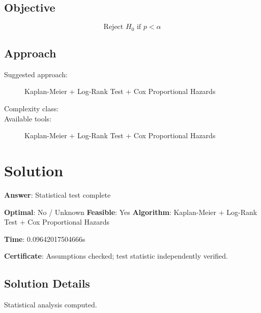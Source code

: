\documentclass[11pt, a4paper]{article}
\begin{document}
\subsection{Objective}

\begin{equation}
\text{Reject } H_0 \text{ if } p < \alpha
\end{equation}

\subsection{Approach}

\begin{description}
  \item[Suggested approach:] Kaplan-Meier + Log-Rank Test + Cox Proportional Hazards
  \item[Complexity class:] 
  \item[Available tools:] Kaplan-Meier + Log-Rank Test + Cox Proportional Hazards
\end{description}
\section{Solution}

\begin{polyaresult}

\textbf{Answer}: Statistical test complete


\textbf{Optimal}: No / Unknown \hfill
\textbf{Feasible}: Yes
\textbf{Algorithm}: Kaplan-Meier + Log-Rank Test + Cox Proportional Hazards \quad $$

\textbf{Time}: 0.09642017504666s

\textbf{Certificate}: Assumptions checked; test statistic independently verified.

\end{polyaresult}

\subsection{Solution Details}

Statistical analysis computed.

\end{document}
